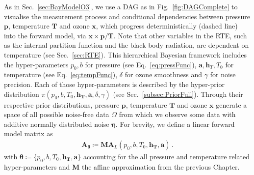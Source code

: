 As in Sec.~\ref{sec:BayModelO3}, we use a DAG as in Fig.~\ref{fig:DAGComplete} to visualise the measurement process and conditional dependencies between pressure $\bm{p}$, temperature $\bm{T}$ and ozone $\bm{x}$, which progress deterministically (dashed line) into the forward model, via $\bm{x} \times \bm{p} / \bm{T}$.
Note that other variables in the RTE, such as the internal partition function and the black body radiation, are dependent on temperature (see Sec.~\ref{sec:RTE}).
This hierarchical Bayesian framework includes the hyper-parameters $p_0, b$ for pressure (see Eq.~\ref{eq:pressFunc}), $\bm{a}, \bm{h}_T, T_0$ for temperature (see Eq.~\ref{eq:tempFunc}), $\delta$ for ozone smoothness and $\gamma$ for noise precision.
Each of those hyper-parameters is described by the hyper-prior distribution $\pi(p_0,b,T_0,\bm{h_T},\bm{a}, \delta,\gamma)$ (see Sec.~\ref{subsec:PriorFull}).
Through their respective prior distributions, pressure $\bm{p}$, temperature $\bm{T}$ and ozone $\bm{x}$ generate a space of all possible noise-free data $\Omega$ from which we observe some data with additive normally distributed noise $\bm{\eta}$.
For brevity, we define a linear forward model matrix as
\begin{align}
	\bm{A}_{\bm{\theta}} \coloneqq \bm{M}\bm{A}_L(p_0,b,T_0,\bm{h_T},\bm{a}) \, .
\end{align}
with $\bm{\theta}  \coloneqq \{p_0,b,T_0,\bm{h_T},\bm{a}  \}$ accounting for the all pressure and temperature related hyper-parameters and $\bm{M}$ the affine approximation from the previous Chapter.
